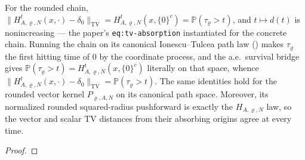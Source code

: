 \begin{lemma}
  \label{lem:Hkernel-tv}
  \leanok
  For the rounded chain,
  $\|H^t_{A,\varrho,N}(x,\cdot)-\delta_0\|_{\mathrm{TV}} = H^t_{A,\varrho,N}(x,\{0\}^c)
  = \mathbb P(\tau_\varrho > t)$, and $t\mapsto d(t)$ is nonincreasing — the paper's
  \texttt{eq:tv-absorption} instantiated for the concrete chain. Running the chain on its
  canonical Ionescu--Tulcea path law () makes $\tau_\varrho$ the
  first hitting time of $0$ by the coordinate process, and the a.e.\ survival bridge gives
  $\mathbb P(\tau_\varrho > t)=H^t_{A,\varrho,N}(x,\{0\}^c)$ literally on that space, whence
  $\|H^t_{A,\varrho,N}(x,\cdot)-\delta_0\|_{\mathrm{TV}} = \mathbb P(\tau_\varrho > t)$.
  The same identities hold for the rounded vector kernel $P_{\varrho,A,N}$ on its
  canonical path space.  Moreover, its normalized rounded squared-radius pushforward is
  exactly the $H_{A,\varrho,N}$ law, so the vector and scalar TV distances from their
  absorbing origins agree at every time.
\end{lemma}
\begin{proof}\leanok{}\end{proof}


